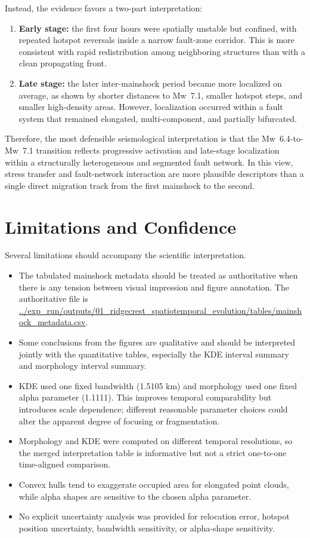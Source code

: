 \documentclass[11pt]{article}
\begin{document}
Instead, the evidence favors a two-part interpretation:
\begin{enumerate}[leftmargin=2em]
    \item \textbf{Early stage:} the first four hours were spatially unstable but confined, with repeated hotspot reversals inside a narrow fault-zone corridor. This is more consistent with rapid redistribution among neighboring structures than with a clean propagating front.
    \item \textbf{Late stage:} the later inter-mainshock period became more localized on average, as shown by shorter distances to Mw~7.1, smaller hotspot steps, and smaller high-density areas. However, localization occurred within a fault system that remained elongated, multi-component, and partially bifurcated.
\end{enumerate}

Therefore, the most defensible seismological interpretation is that the Mw~6.4-to-Mw~7.1 transition reflects progressive activation and late-stage localization within a structurally heterogeneous and segmented fault network. In this view, stress transfer and fault-network interaction are more plausible descriptors than a single direct migration track from the first mainshock to the second.

\section{Limitations and Confidence}
Several limitations should accompany the scientific interpretation.

\begin{itemize}[leftmargin=2em]
    \item The tabulated mainshock metadata should be treated as authoritative when there is any tension between visual impression and figure annotation. The authoritative file is \url{../exp_run/outputs/01_ridgecrest_spatiotemporal_evolution/tables/mainshock_metadata.csv}.
    \item Some conclusions from the figures are qualitative and should be interpreted jointly with the quantitative tables, especially the KDE interval summary and morphology interval summary.
    \item KDE used one fixed bandwidth (1.5105 km) and morphology used one fixed alpha parameter (1.1111). This improves temporal comparability but introduces scale dependence; different reasonable parameter choices could alter the apparent degree of focusing or fragmentation.
    \item Morphology and KDE were computed on different temporal resolutions, so the merged interpretation table is informative but not a strict one-to-one time-aligned comparison.
    \item Convex hulls tend to exaggerate occupied area for elongated point clouds, while alpha shapes are sensitive to the chosen alpha parameter.
    \item No explicit uncertainty analysis was provided for relocation error, hotspot position uncertainty, bandwidth sensitivity, or alpha-shape sensitivity.
\end{itemize}
\end{document}
